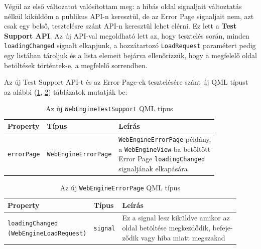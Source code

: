 \documentclass[12pt]{report}
\begin{document}
Végül az első változatot valósítottam meg: a hibás oldal signaljait változtatás nélkül
kiküldöm a publikus API-n keresztül, de az Error Page signaljait nem, azt csak egy belső,
tesztelésre szánt API-n keresztül lehet elérni. Ez lett a \textbf{Test Support API}.
Az új API-val megoldható lett az, hogy tesztelés során, minden \texttt{loadingChanged}
signalt elkapjunk, a hozzátartozó \texttt{LoadRequest} paramétert pedig egy listában tároljuk
és a lista elemeit bejárva ellenőrizzük, hogy a megfelelő oldal betöltések történtek-e, a
megfelelő sorrendben.

Az új Test Support API-t és az Error Page-ek tesztelésére szánt új QML típust az alábbi
(\ref{tab:test-support-webengine-testsupport}, \ref{tab:test-support-webengine-errorpage})
táblázatok mutatják be:
\begin{table}[h]
    \centering
    \begin{tabular}{ | l | l | p{195pt} | }
        \hline
        \textbf{Property} & \textbf{Típus} & \textbf{Leírás} \\ \hline

        \texttt{errorPage} & \texttt{WebEngineErrorPage} &
        \makecell[l]{
            \texttt{WebEngineErrorPage} példány, \\
            a \texttt{WebEngineView}-ba betöltött \\
            Error Page \texttt{loadingChanged} \\
            signaljának elkapására}
        \\ \hline
    \end{tabular}
    \caption{
        \label{tab:test-support-webengine-testsupport}
        Az új \texttt{WebEngineTestSupport} QML típus
    }
\end{table}
\begin{table}[h]
    \centering
    \begin{tabular}{ | l | l | p{185pt} | }
        \hline
        \textbf{Property} & \textbf{Típus} & \textbf{Leírás} \\ \hline

        \makecell[l]{\texttt{loadingChanged} \\ \texttt{(WebEngineLoadRequest)}} &
        \texttt{signal} &
        \makecell[l]{
        Ez a signal lesz kiküldve amikor az \\
        oldal betöltése megkezdődik, befeje-\\
        ződik vagy hiba miatt megszakad}
        \\ \hline
    \end{tabular}
    \caption{
        \label{tab:test-support-webengine-errorpage}
        Az új \texttt{WebEngineErrorPage} QML típus
    }
\end{table}
\end{document}
